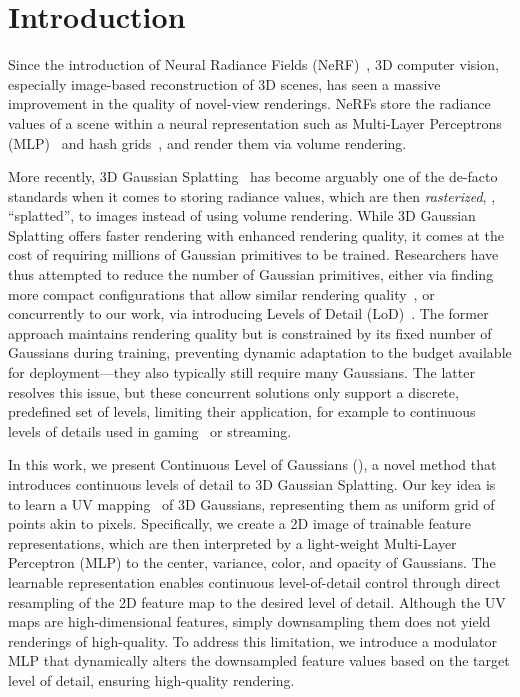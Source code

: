 \section{Introduction}
  \label{sec:clog-intro}

  Since the introduction of Neural Radiance Fields
  (NeRF)~\cite{mildenhall2020nerf}, 3D computer vision, especially image-based
  reconstruction of 3D scenes, has seen a massive improvement in the quality
  of novel-view renderings.
  NeRFs store the radiance values of a scene within a neural representation
  such as Multi-Layer Perceptrons (MLP)~\cite{mildenhall2020nerf} and hash
  grids~\cite{mueller2022instant}, and render them via volume rendering.

  More recently, 3D Gaussian Splatting~\cite{kerbl20233d} has become arguably
  one of the de-facto standards when it comes to storing radiance values,
  which are then \emph{rasterized}, \ie, ``splatted'', to images instead of
  using volume rendering.
  While 3D Gaussian Splatting offers faster rendering with enhanced rendering
  quality, it comes at the cost of requiring millions of Gaussian primitives
  to be trained.
  Researchers have thus attempted to reduce the number of Gaussian primitives,
  either via finding more compact configurations that allow similar rendering
  quality~\cite{fan2023lightgaussian,lee2024compact,niedermayr2024compressed,niemeyer2024radsplat},
  or concurrently to our work, via introducing Levels of Detail
  (LoD)~\cite{seo2024flod,shi2024lapisgs}.
  The former approach maintains rendering quality but is constrained by its
  fixed number of Gaussians during training, preventing dynamic adaptation to
  the budget available for deployment---they also typically still require many
  Gaussians.
  The latter resolves this issue, but these concurrent solutions only support
  a discrete, predefined set of levels, limiting their application, for
  example to continuous levels of details used in
  gaming~\cite{venter2022unreal} or streaming.

  In this work, we present Continuous Level of Gaussians (\clog), a novel
  method that introduces continuous levels of detail to 3D Gaussian Splatting.
  Our key idea is to learn a UV mapping~\cite{flavell2010uv} of 3D Gaussians,
  representing them as uniform grid of points akin to pixels.
  Specifically, we create a 2D image of trainable feature representations,
  which are then interpreted by a light-weight Multi-Layer Perceptron (MLP) to
  the center, variance, color, and opacity of Gaussians.
  The learnable representation enables continuous level-of-detail control
  through direct resampling of the 2D feature map to the desired level of
  detail.
  Although the UV maps are high-dimensional features, simply downsampling them
  does not yield renderings of high-quality.
  To address this limitation, we introduce a modulator MLP that dynamically
  alters the downsampled feature values based on the target level of detail,
  ensuring high-quality rendering.

